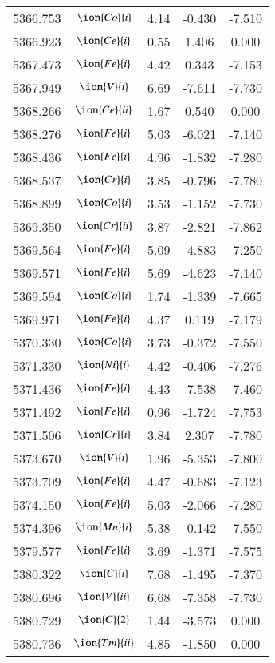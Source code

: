 \documentclass[fleqn,usenatbib]{mnras}
\begin{document}
\begin{center}
\begin{table}
\begin{tabular}{ccccc}
5366.753 &  $\ion{Co}{i}$  & 4.14 & -0.430 & -7.510 \\ 
5366.923 &  $\ion{Ce}{i}$  & 0.55 & 1.406 & 0.000 \\ 
5367.473 &  $\ion{Fe}{i}$  & 4.42 & 0.343 & -7.153 \\ 
5367.949 &  $\ion{V}{i}$  & 6.69 & -7.611 & -7.730 \\ 
5368.266 &  $\ion{Ce}{ii}$  & 1.67 & 0.540 & 0.000 \\ 
5368.276 &  $\ion{Fe}{i}$  & 5.03 & -6.021 & -7.140 \\ 
5368.436 &  $\ion{Fe}{i}$  & 4.96 & -1.832 & -7.280 \\ 
5368.537 &  $\ion{Cr}{i}$  & 3.85 & -0.796 & -7.780 \\ 
5368.899 &  $\ion{Co}{i}$  & 3.53 & -1.152 & -7.730 \\ 
5369.350 &  $\ion{Cr}{ii}$  & 3.87 & -2.821 & -7.862 \\ 
5369.564 &  $\ion{Fe}{i}$  & 5.09 & -4.883 & -7.250 \\ 
5369.571 &  $\ion{Fe}{i}$  & 5.69 & -4.623 & -7.140 \\ 
5369.594 &  $\ion{Co}{i}$  & 1.74 & -1.339 & -7.665 \\ 
5369.971 &  $\ion{Fe}{i}$  & 4.37 & 0.119 & -7.179 \\ 
5370.330 &  $\ion{Co}{i}$  & 3.73 & -0.372 & -7.550 \\ 
5371.330 &  $\ion{Ni}{i}$  & 4.42 & -0.406 & -7.276 \\ 
5371.436 &  $\ion{Fe}{i}$  & 4.43 & -7.538 & -7.460 \\ 
5371.492 &  $\ion{Fe}{i}$  & 0.96 & -1.724 & -7.753 \\ 
5371.506 &  $\ion{Cr}{i}$  & 3.84 & 2.307 & -7.780 \\ 
5373.670 &  $\ion{V}{i}$  & 1.96 & -5.353 & -7.800 \\ 
5373.709 &  $\ion{Fe}{i}$  & 4.47 & -0.683 & -7.123 \\ 
5374.150 &  $\ion{Fe}{i}$  & 5.03 & -2.066 & -7.280 \\ 
5374.396 &  $\ion{Mn}{i}$  & 5.38 & -0.142 & -7.550 \\ 
5379.577 &  $\ion{Fe}{i}$  & 3.69 & -1.371 & -7.575 \\ 
5380.322 &  $\ion{C}{i}$  & 7.68 & -1.495 & -7.370 \\ 
5380.696 &  $\ion{V}{ii}$  & 6.68 & -7.358 & -7.730 \\ 
5380.729 &  $\ion{C}{2}$ & 1.44 & -3.573 & 0.000 \\ 
5380.736 &  $\ion{Tm}{ii}$  & 4.85 & -1.850 & 0.000 \\ 

\end{tabular}
\end{table}
\end{center}
\end{document}
